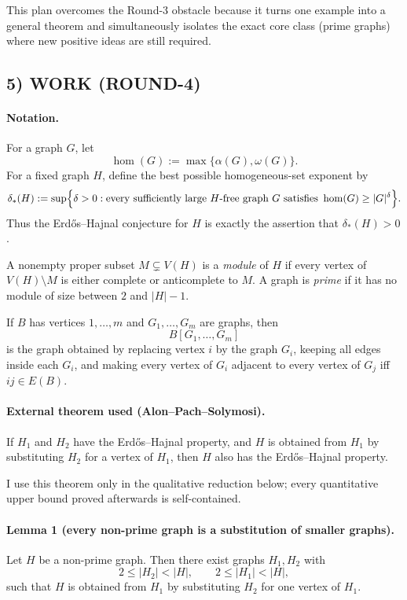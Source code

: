 This plan overcomes the Round-3 obstacle because it turns one example into a general theorem and simultaneously isolates the exact core class (prime graphs) where new positive ideas are still required.

\subsection*{5) WORK (ROUND-4)}
\paragraph{Notation.}
For a graph $G$, let
\[
\hom(G):=\max\{\alpha(G),\omega(G)\}.
\]
For a fixed graph $H$, define the best possible homogeneous-set exponent by
\[
\delta_*(H):=\sup\Bigl\{\delta>0: \text{every sufficiently large $H$-free graph $G$ satisfies }\hom(G)\ge |G|^{\delta}\Bigr\}.
\]
Thus the Erd\H{o}s--Hajnal conjecture for $H$ is exactly the assertion that $\delta_*(H)>0$.

A nonempty proper subset $M\subsetneq V(H)$ is a \emph{module} of $H$ if every vertex of $V(H)\setminus M$ is either complete or anticomplete to $M$.
A graph is \emph{prime} if it has no module of size between $2$ and $|H|-1$.

If $B$ has vertices $1,\dots,m$ and $G_1,\dots,G_m$ are graphs, then
\[
B[G_1,\dots,G_m]
\]
is the graph obtained by replacing vertex $i$ by the graph $G_i$, keeping all edges inside each $G_i$, and making every vertex of $G_i$ adjacent to every vertex of $G_j$ iff $ij\in E(B)$.

\medskip
\paragraph{External theorem used (Alon--Pach--Solymosi).}
If $H_1$ and $H_2$ have the Erd\H{o}s--Hajnal property, and $H$ is obtained from $H_1$ by substituting $H_2$ for a vertex of $H_1$, then $H$ also has the Erd\H{o}s--Hajnal property.

I use this theorem only in the qualitative reduction below; every quantitative upper bound proved afterwards is self-contained.

\medskip
\paragraph{Lemma 1 (every non-prime graph is a substitution of smaller graphs).}
Let $H$ be a non-prime graph.
Then there exist graphs $H_1,H_2$ with
\[
2\le |H_2|<|H|,\qquad 2\le |H_1|<|H|,
\]
such that $H$ is obtained from $H_1$ by substituting $H_2$ for one vertex of $H_1$.

